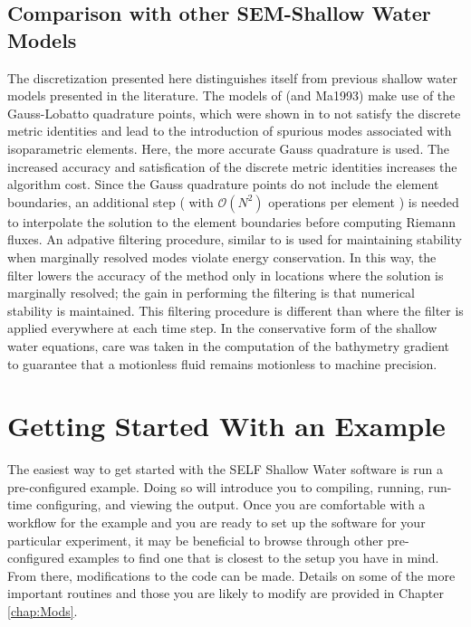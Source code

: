 \documentclass{softwaremanual}
\begin{document}
\section{Comparison with other SEM-Shallow Water Models}
The discretization presented here distinguishes itself from previous shallow water models presented in the literature. The models of \citet{Iskandarani1995} (and Ma1993) make use of the Gauss-Lobatto quadrature points, which were shown in \citet{Kopriva2006} to not satisfy the discrete metric identities and lead to the introduction of spurious modes associated with isoparametric elements. Here, the more accurate Gauss quadrature is used. The increased accuracy and satisfication of the discrete metric identities increases the algorithm cost. Since the Gauss quadrature points do not include the element boundaries, an additional step ( with $\mathcal{O}(N^2)$ operations per element ) is needed to interpolate the solution to the element boundaries before computing Riemann fluxes. An adpative filtering procedure, similar to \citet{Flad2016} is used for maintaining stability when marginally resolved modes violate energy conservation. In this way, the filter lowers the accuracy of the method only in locations where the solution is marginally resolved; the gain in performing the filtering is that numerical stability is maintained. This filtering procedure is different than \citet{Taylor1997} where the filter is applied everywhere at each time step. In the conservative form of the shallow water equations, care was taken in the computation of the bathymetry gradient to guarantee that a motionless fluid remains motionless to machine precision.



\chapter{Getting Started With an Example}
The easiest way to get started with the SELF Shallow Water software is run a pre-configured example. Doing so will introduce you to compiling, running, run-time configuring, and viewing the output. Once you are comfortable with a workflow for the example and you are ready to set up the software for your particular experiment, it may be beneficial to browse through other pre-configured examples to find one that is closest to the setup you have in mind. From there, modifications to the code can be made. Details on some of the more important routines and those you are likely to modify are provided in Chapter \ref{chap:Mods}.
\end{document}
